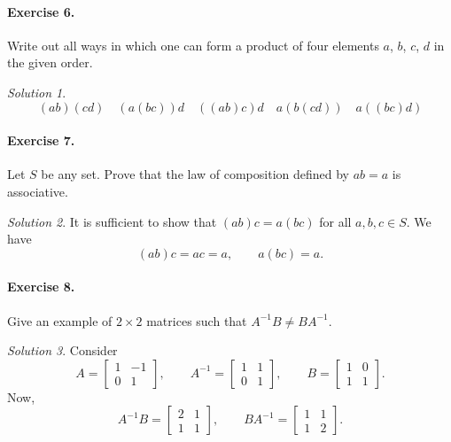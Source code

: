\documentclass[11pt]{report}
\theoremstyle{remark}
\newtheorem*{solution}{Solution}
\begin{document}
    \paragraph{Exercise 6.} Write out all ways in which one can form a product of
    four elements $a$, $b$, $c$, $d$ in the given order.
    \begin{solution}
        \[
            (ab)(cd) \quad (a(bc))d \quad ((ab)c)d \quad a(b(cd)) \quad a((bc)d)
        \] 
    \end{solution}
    
    \paragraph{Exercise 7.} Let $S$ be any set. Prove that the law of composition
    defined by $ab = a$ is associative.
    \begin{solution}
        It is sufficient to show that $(ab)c = a(bc)$ for all $a, b, c \in S$. We
        have \[
            (ab)c = ac = a, \qquad a(bc) = a.
        \] 
    \end{solution}
    
    \paragraph{Exercise 8.} Give an example of $2\times 2$ matrices such that
    $A^{-1}B \neq BA^{-1}$.
    \begin{solution}
        Consider \[
            A = \begin{bmatrix}
                1 & -1 \\ 0 & 1
            \end{bmatrix}, \qquad
            A^{-1} = \begin{bmatrix}
                1 & 1 \\ 0 & 1
            \end{bmatrix}, \qquad
            B = \begin{bmatrix}
                1 & 0 \\ 1 & 1 
            \end{bmatrix}.
        \] Now, \[
            A^{-1}B = \begin{bmatrix}
                2 & 1 \\ 1 & 1
            \end{bmatrix}, \qquad
            BA^{-1} = \begin{bmatrix}
                1 & 1 \\ 1 & 2
            \end{bmatrix}.
        \] 
    \end{solution}
\end{document}
